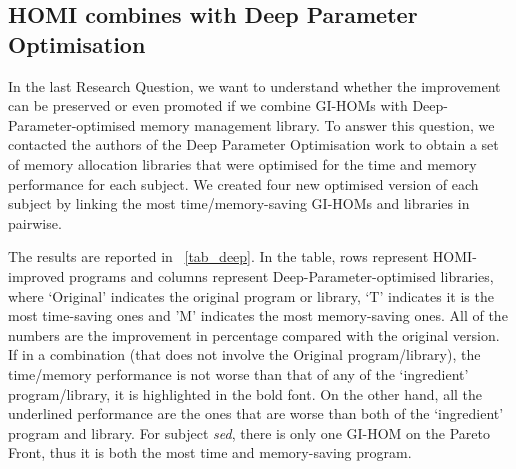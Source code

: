 \documentclass[oribibl]{llncs}
\begin{document}
{\subsection{HOMI combines with Deep Parameter Optimisation}
\label{sec_resdeep}

In the last Research Question, we want to understand whether the improvement can be preserved or even promoted if we combine GI-HOMs with Deep-Parameter-optimised memory management library. 
To answer this question, we contacted the authors of the Deep Parameter Optimisation work to obtain a set of memory allocation libraries that were optimised for the time and memory performance for each subject. We created four new optimised version of each subject by linking the most time/memory-saving GI-HOMs and libraries in pairwise.



The results are reported in \tablename~\ref{tab_deep}.
In the table, rows represent HOMI-improved programs and columns represent Deep-Parameter-optimised libraries, where `Original' indicates the original program or library, `T' indicates it is the most time-saving ones and 'M' indicates the most memory-saving ones.
All of the numbers are the improvement in percentage compared with the original version.
If in a combination (that does not involve the Original program/library), the time/memory performance is not worse than that of any of the `ingredient' program/library, it is highlighted in the bold font.
On the other hand, all the underlined performance are the ones that are worse than both of the `ingredient' program and library.
For subject \emph{sed}, there is only one GI-HOM on the Pareto Front, thus it is both the most time and memory-saving program.

}
\end{document}
